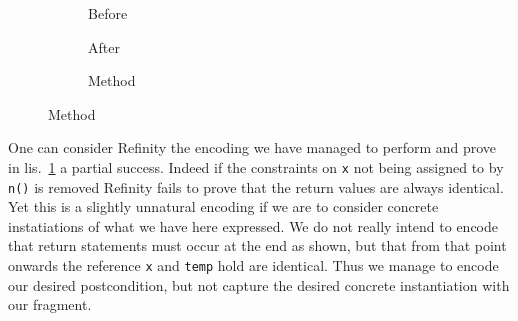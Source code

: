 \begin{figure}[!h]
  \centering
  \begin{subfigure}[b]{.34\linewidth}
    
    \caption{Before}
  \end{subfigure}\hspace{1cm}
  \begin{subfigure}[b]{.34\linewidth}
    
    \caption{After}
  \end{subfigure}\vspace{1mm}
  \begin{subfigure}[b]{.39\linewidth}
    
    \caption{Method}
  \end{subfigure}
\label{lst:ExtractVariable-refinity}
\end{figure}

One can consider Refinity the encoding we have managed to perform and prove in lis.~\ref{lst:ExtractVariable-refinity} a partial success. Indeed if the constraints on
\lstinline[style=refinity]|x| not being assigned to by \lstinline[style=refinity]|n()| is removed Refinity fails to prove that the return values are always identical.
Yet this is a slightly unnatural encoding if we are to consider concrete instatiations of what we have here expressed. We do not really intend to encode that return
statements must occur at the end as shown, but that from that point onwards the reference \lstinline[style=refinity]|x| and \lstinline[style=refinity]|temp| hold
are identical. Thus we manage to encode our desired postcondition, but not capture the desired concrete instantiation with our fragment.
